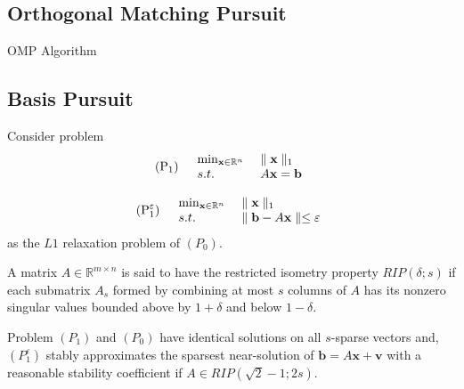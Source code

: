 \subsection{Orthogonal Matching Pursuit}
\begin{algorithm}[H]
    \SetAlgoLined
    \KwData{}
     \;
     \While{}{
     }
     \Return{}
     \caption{OMP Algorithm}
\end{algorithm}


\subsection{Basis Pursuit}
Consider problem
\begin{align}
    (\textnormal{P}_1) \quad
    \begin{array}{ll}
        \min_{\mathbf{x} \in \mathbb{R}^n}
        \ &\parallel \mathbf{x} \parallel_1 \\
        s.t. \ &A\mathbf{x} = \mathbf{b}
    \end{array}
\end{align}

\begin{align}
    (\textnormal{P}_1^\varepsilon) \quad
    \begin{array}{ll}
        \min_{\mathbf{x} \in \mathbb{R}^n}
        \ &\parallel \mathbf{x} \parallel_1 \\
        s.t. \ &\parallel \mathbf{b} - A\mathbf{x} \parallel \leq \varepsilon
    \end{array}
\end{align}
as the $L1$ relaxation problem of $(P_0)$.
\par
\begin{definition}[RIP]
    A matrix $A \in \mathbb{R}^{m\times n}$
    is said to have the restricted isometry property
    $RIP(\delta; s)$ if each submatrix $A_s$ formed
    by combining at most $s$ columns of $A$ has its
    nonzero singular values bounded above by $1 + \delta$
    and below $1 - \delta$.
\end{definition}

\begin{theorem}
    Problem $(P_1)$ and $(P_0)$ have
    identical solutions on all $s$-sparse
    vectors and, $(P_1^\varepsilon)$ stably
    approximates the sparsest near-solution
    of $\mathbf{b} = A \mathbf{x} + \mathbf{v}$
    with a reasonable stability coefficient
    if $A \in RIP(\sqrt{2} - 1; 2s)$.
\end{theorem}

